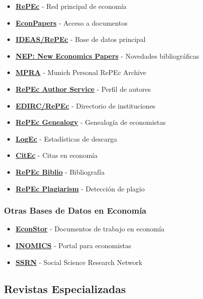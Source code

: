 \documentclass[
  jou,
  floatsintext,
  longtable,
  a4paper,
  nolmodern,
  notxfonts,
  notimes,
  12pt,
  colorlinks=true,linkcolor=blue,citecolor=blue,urlcolor=blue]{apa7}
\providecommand{\tightlist}{%
  \setlength{\itemsep}{0pt}\setlength{\parskip}{0pt}}
\begin{document}
\begin{itemize}
\tightlist
\item
  \textbf{\href{http://repec.org/}{RePEc}} - Red principal de economía
\item
  \textbf{\href{https://econpapers.repec.org/}{EconPapers}} - Acceso a
  documentos
\item
  \textbf{\href{https://ideas.repec.org/}{IDEAS/RePEc}} - Base de datos
  principal
\item
  \textbf{\href{https://nep.repec.org/}{NEP: New Economics Papers}} -
  Novedades bibliográficas
\item
  \textbf{\href{https://mpra.ub.uni-muenchen.de/}{MPRA}} - Munich
  Personal RePEc Archive
\item
  \textbf{\href{https://authors.repec.org/}{RePEc Author Service}} -
  Perfil de autores
\item
  \textbf{\href{https://edirc.repec.org/}{EDIRC/RePEc}} - Directorio de
  instituciones
\item
  \textbf{\href{https://genealogy.repec.org/}{RePEc Genealogy}} -
  Genealogía de economistas
\item
  \textbf{\href{https://logec.repec.org/}{LogEc}} - Estadísticas de
  descarga
\item
  \textbf{\href{https://citec.repec.org/}{CitEc}} - Citas en economía
\item
  \textbf{\href{https://biblio.repec.org/}{RePEc Biblio}} - Bibliografía
\item
  \textbf{\href{https://plagiarism.repec.org/}{RePEc Plagiarism}} -
  Detección de plagio
\end{itemize}

\subsubsection{Otras Bases de Datos en
Economía}\label{otras-bases-de-datos-en-economuxeda}

\begin{itemize}
\tightlist
\item
  \textbf{\href{https://www.econstor.eu/}{EconStor}} - Documentos de
  trabajo en economía
\item
  \textbf{\href{https://inomics.com/}{INOMICS}} - Portal para
  economistas
\item
  \textbf{\href{https://www.ssrn.com/index.cfm/en/}{SSRN}} - Social
  Science Research Network
\end{itemize}

\subsection{Revistas Especializadas}\label{revistas-especializadas}
\end{document}
